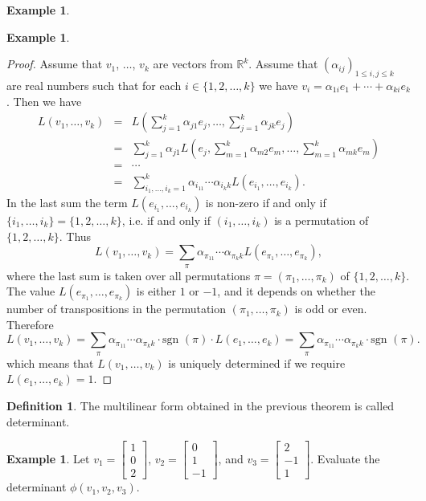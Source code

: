 \documentclass[11pt]{article}
\theoremstyle{definition}
\newtheorem{defn}[thm]{Definition}
\newtheorem{exmp}[thm]{Example}
\theoremstyle{plain}
\begin{document}
\begin{exmp}
\begin{exmp}
\begin{proof}
Assume that \( v_1 \), \( \dots \), \( v_k \) are vectors from \( \mathbb R^k \). Assume that \( (\alpha_{ij})_{1\leq i,j\leq k} \) are real numbers such that for each \( i\in\{1,2,\dots, k\} \) we have \( v_i=\alpha_{1i}e_1+\cdots+\alpha_{ki}e_k \). Then we have \begin{eqnarray*} L(v_1,\dots, v_k)&=&L\left(\sum_{j=1}^k \alpha_{j1}e_j,\dots, \sum_{j=1}^k\alpha_{jk}e_j\right)\\ &=&\sum_{j=1}^k \alpha_{j1}L\left(e_j,\sum_{m=1}^k\alpha_{m2}e_m,\dots, \sum_{m=1}^k\alpha_{mk}e_m\right)\\ &=&\cdots\\ &=&\sum_{i_1,\dots, i_k=1}^k \alpha_{i_11}\cdots\alpha_{i_kk}L\left(e_{i_1},\dots, e_{i_k}\right). \end{eqnarray*} In the last sum the term \( L\left(e_{i_1},\dots, e_{i_k}\right) \) is non-zero if and only if \( \{i_1,\dots, i_k\}=\{1,2,\dots, k\} \), i.e. if and only if \( (i_1,\dots, i_k) \) is a permutation of \( \{1,2,\dots, k\} \). Thus \[ L(v_1,\dots, v_k)=\sum_{\pi}\alpha_{\pi_11}\cdots \alpha_{\pi_kk}L\left(e_{\pi_1},\dots, e_{\pi_k}\right),\] where the last sum is taken over all permutations \( \pi=(\pi_1,\dots, \pi_k) \) of \( \{1,2,\dots, k\} \). The value \( L\left(e_{\pi_1},\dots, e_{\pi_k}\right) \) is either \( 1 \) or \( -1 \), and it depends on whether the number of transpositions in the permutation \( (\pi_1,\dots, \pi_k) \) is odd or even. Therefore \[ L(v_1,\dots, v_k)=\sum_{\pi}\alpha_{\pi_11}\cdots \alpha_{\pi_kk}\cdot \mbox{sgn }(\pi)\cdot L\left(e_1,\dots, e_k\right)=\sum_{\pi}\alpha_{\pi_11}\cdots \alpha_{\pi_kk}\cdot \mbox{sgn }(\pi). \] which means that \( L(v_1, \dots, v_k) \) is uniquely determined if we require \( L(e_1,\dots, e_k)=1 \).
\end{proof}

\begin{defn}
The multilinear form obtained in the previous theorem is called determinant.
\end{defn}

\begin{exmp}
Let \( v_1=\left[\begin{array}{c} 1\\0\\2\end{array}\right]\), \( v_2=\left[\begin{array}{c} 0\\1\\-1\end{array}\right]\), and \( v_3=\left[\begin{array}{c} 2\\-1\\1\end{array}\right]\). Evaluate the determinant \( \phi(v_1,v_2,v_3) \).
\end{exmp}


\end{exmp}
\end{exmp}
\end{document}
